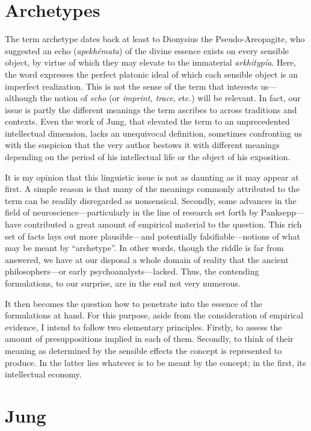 \documentclass[a4paper]{article}
\begin{document}
\section{Archetypes}

The term archetype dates back at least to Dionysius the
Pseudo-Areopagite, who suggested an echo (\textit{apekhémata}) of the divine
essence exists on every sensible object, by virtue of which they may elevate
to the immaterial \textit{arkhitypía}. Here, the word expresses the perfect
platonic ideal of which each sensible object is an imperfect realization.
This is not the sense of the term that interests us---although the notion of
\textit{echo} (or \textit{imprint, trace}, etc.) will be relevant. In fact,
our issue is partly the different meanings the term ascribes to across
traditions and contexts. Even the work of Jung, that elevated the term to an
unprecedented intellectual dimension, lacks an unequivocal definition,
sometimes confronting us with the suspicion that the very author
bestows it with different meanings depending on the period of his
intellectual life or the object of his exposition. 

It is my opinion that this linguistic issue is not as daunting as it may
appear at first. A simple reason is that many of the meanings commonly
attributed to the term can be readily disregarded as nonsensical. Secondly,
some advances in the field of neuroscience—particularly in the line of
research set forth by Panksepp—have contributed a great amount of empirical
material to the question. This rich set of facts lays out more plausible—and
potentially falsifiable—notions of what may be meant by “archetype”. In
other words, though the riddle is far from answered, we have at our disposal
a whole domain of reality that the ancient philosophers—or early
psychoanalysts—lacked. Thus, the contending formulations, to our surprise,
are in the end not very numerous. 

It then becomes the question how to penetrate into the essence of the
formulations at hand. For this purpose, aside from the consideration of
empirical evidence, I intend to follow two elementary principles. Firstly, to
assess the amount of presuppositions implied in each of them. Secondly, to think
of their meaning as determined by the sensible effects the concept is
represented to produce. In the latter lies whatever is to be meant by the
concept; in the first, its intellectual economy. 

\section{Jung}
\end{document}
